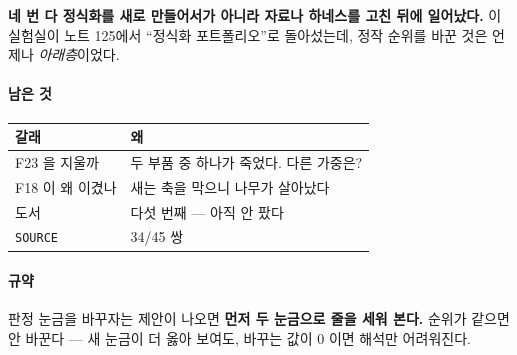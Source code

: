 \documentclass[10pt]{article}
\begin{document}
\textbf{네 번 다 정식화를 새로 만들어서가 아니라 자료나 하네스를 고친 뒤에
일어났다.} 이 실험실이 노트 125에서 ``정식화 포트폴리오''로 돌아섰는데,
정작 순위를 바꾼 것은 언제나 \emph{아래층}이었다.

\paragraph{남은 것}
\begin{center}\small
\begin{tabular}{ll}
\hline
갈래 & 왜 \\
\hline
F23 을 지울까 & 두 부품 중 하나가 죽었다. 다른 가중은? \\
F18 이 왜 이겼나 & 새는 축을 막으니 나무가 살아났다 \\
도서 & 다섯 번째 --- 아직 안 팠다 \\
\texttt{SOURCE} & 34/45 쌍 \\
\hline
\end{tabular}
\end{center}

\paragraph{규약} 판정 눈금을 바꾸자는 제안이 나오면 \textbf{먼저 두 눈금으로
줄을 세워 본다.} 순위가 같으면 안 바꾼다 --- 새 눈금이 더 옳아 보여도,
바꾸는 값이 0 이면 해석만 어려워진다.
\end{document}
